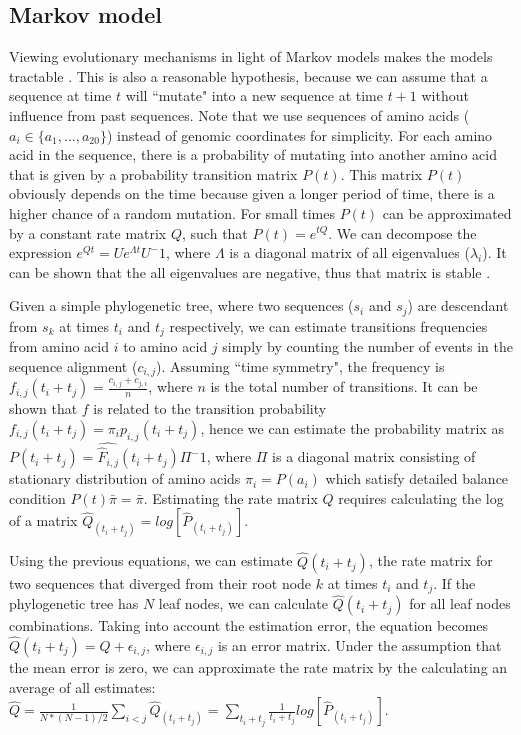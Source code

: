 
\subsection{Markov model}

Viewing evolutionary mechanisms in light of Markov models makes the models tractable \cite{yang2006computational}. This is also a reasonable hypothesis, because we can assume that a sequence at time $t$ will ``mutate" into a new sequence at time $t+1$ without influence from past sequences. Note that we use sequences of amino acids ($a_i \in \{a_1, ..., a_{20}\}$) instead of genomic coordinates for simplicity. For each amino acid in the sequence, there is a probability of mutating into another amino acid \cite{felsenstein2004inferring} that is given by a probability transition matrix $P(t)$. This matrix $P(t)$ obviously depends on the time because given a longer period of time, there is a higher chance of a random mutation. For small times $P(t)$ can be approximated by a constant rate matrix $Q$, such that $P(t) = e^{tQ}$. We can decompose the expression $e^{Qt} = U e^{\Lambda t} U^-1$, where $\Lambda$ is a diagonal matrix of all eigenvalues ($\lambda_i$). It can be shown that the all eigenvalues are negative, thus that matrix is stable \cite{yang2006computational}.

Given a simple phylogenetic tree, where two sequences ($s_i$ and $s_j$) are descendant from $s_k$ at times $t_i$ and $t_j$ respectively, we can estimate transitions frequencies from amino acid $i$ to amino acid $j$ simply by counting the number of events in the sequence alignment ($c_{i,j}$). Assuming ``time symmetry", the frequency is $f_{i,j}(t_i+t_j) = \frac{c_{i,j} + c_{j,i}}{n}$, where $n$ is the total number of transitions. It can be shown that $f$ is related to the transition probability $f_{i,j}(t_i+t_j) = \pi_i p_{i,j}(t_i+t_j)$, hence we can estimate the probability matrix as $\hat{P(t_i+t_j) = \hat{F}_{i,j}(t_i+t_j) \Pi^-1}$, where $\Pi$ is a diagonal matrix consisting of stationary distribution of amino acids $\pi_i = P(a_i)$ which satisfy detailed balance condition $ P(t) \bar{\pi} = \bar{\pi}$. Estimating the rate matrix $Q$ requires calculating the log of a matrix $\hat{Q}_(t_i+t_j) = log[ \hat{P}_(t_i+t_j) ]$.

Using the previous equations, we can estimate $\hat{Q}(t_i+t_j)$, the rate matrix for two sequences that diverged from their root node $k$ at times $t_i$ and $t_j$. If the phylogenetic tree has $N$ leaf nodes, we can calculate $\hat{Q}(t_i+t_j)$ for all leaf nodes combinations. Taking into account the estimation error, the equation becomes $\hat{Q}(t_i+t_j) = Q + \epsilon_{i,j}$, where $\epsilon_{i,j}$ is an error matrix. Under the assumption that the mean error is zero, we can approximate the rate matrix by the calculating an average of all estimates: $\hat{Q} = \frac{1}{N * (N-1)/2} \sum_{i < j} \hat{Q}_(t_i+t_j) = \sum_{t_i+t_j} \frac{1}{t_i+t_j} log[ \hat{P}_(t_i+t_j) ]$.

